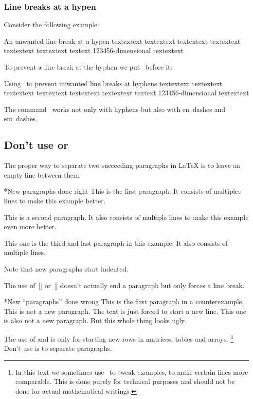 \subsubsection{Line breaks at a hypen}

Consider the following example:
\begin{showlatex}{An unwanted line break at a hypen}
  textextext textextext textextext textextext textextext textextext textext 123456-dimensional textextext
\end{showlatex}
To prevent a line break at the hyphen we put~ before it:
\begin{showlatex}{Using~ to prevent unwanted line breaks at hyphens}
  textextext textextext textextext textextext textextext textextext textext 123456\nobreakdash-dimensional textextext
\end{showlatex}
The command~ works not only with hyphens but also with en~dashes and em~dashes.



\subsection{Don’t use \comtitle{\tbs} or }

The proper way to separate two succeeding paragraphs in {\LaTeX} is to leave an empty line between them.
\begin{showlatex}*{New paragraphs done right}
This is the first paragraph.
It consists of multiples lines to make this example better.

This is a second paragraph.
It also consists of multiple lines to make this example even more better.

This one is the third and last paragraph in this example.
It also consists of multiple lines.
\end{showlatex}
Note that new paragraphs start indented.

The use of~\comname{\tbs}\massindex{\tbs}[\comname] or~[\comname] doesn’t actually end a paragraph but only forces a line break.
\begin{showlatex}*{New \enquote{paragraphs} done wrong}
This is the first paragraph in a counterexample.\\
This is not a new paragraph.
The text is just forced to start a new line.\newline
This one is also not a new paragraph.
But this whole thing looks ugly.
\end{showlatex}
The use of \comname{\tbs} and  is only for starting new rows in matrices, tables and arrays.%
\footnote{
  In this text we sometimes use~\comname{\tbs} to tweak examples, to make certain lines more comparable.
  This is done purely for technical purposes and should not be done for actual mathematical writings.
}
Don’t use is to separate paragraphs.



